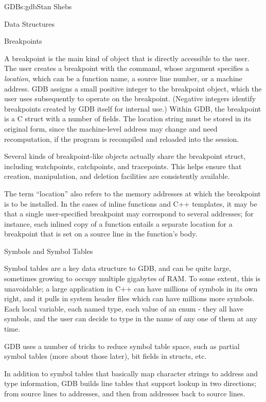 \begin{aosachapter}{GDB}{s:gdb}{Stan Shebs}
\begin{aosasect1}{Data Structures}
\end{aosasect1}

\begin{aosasect2}{Breakpoints}

A breakpoint is the main kind of object that is directly accessible to
the user.  The user creates a breakpoint with the  command,
whose argument specifies a {\em location}, which can be a function
name, a source line number, or a machine address.  GDB assigns a small
positive integer to the breakpoint object, which the user uses
subsequently to operate on the breakpoint.  (Negative integers
identify breakpoints created by GDB itself for internal use.)  Within
GDB, the breakpoint is a C struct with a number of fields.  The
location string must be stored in its original form, since the
machine-level address may change and need recomputation, if the
program is recompiled and reloaded into the session.

Several kinds of breakpoint-like objects actually share the breakpoint
struct, including watchpoints, catchpoints, and tracepoints.  This
helps ensure that creation, manipulation, and deletion facilities are
consistently available.

The term ``location'' also refers to the memory addresses at which the
breakpoint is to be installed.  In the cases of inline functions and
C++ templates, it may be that a single user-specified breakpoint may
correspond to several addresses; for instance, each inlined copy of a
function entails a separate location for a breakpoint that is set on a
source line in the function's body.

\end{aosasect2}

\begin{aosasect2}{Symbols and Symbol Tables}

Symbol tables are a key data structure to GDB, and can be quite large,
sometimes growing to occupy multiple gigabytes of RAM.  To some
extent, this is unavoidable; a large application in C++ can have
millions of symbols in its own right, and it pulls in system header
files which can have millions more symbols.  Each local variable, each
named type, each value of an enum - they all have symbols, and the
user can decide to type in the name of any one of them at any time.

GDB uses a number of tricks to reduce symbol table space, such as
partial symbol tables (more about those later), bit fields in structs,
etc.

In addition to symbol tables that basically map character strings to
address and type information, GDB builds line tables that support
lookup in two directions; from source lines to addresses, and then
from addresses back to source lines.


\end{aosasect2}
\end{aosachapter}
